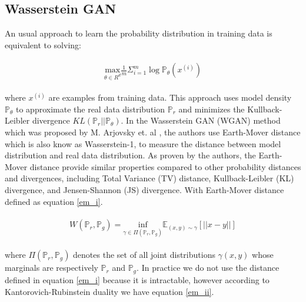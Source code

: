 \documentclass[10pt,twocolumn,letterpaper]{article}
\begin{document}
\subsection{Wasserstein GAN}
\label{wasserstein_gan}

An usual approach to learn the probability distribution in training data is equivalent to solving:

\begin{equation} 
\begin{split}
\begin{aligned}
\underset{\theta \in R^d}{\text{max}} \frac{1}{m} \Sigma_{i=1}^m \log \mathbb{P}_{\theta}(x^{(i)})
\end{aligned}
\end{split}
\label{loss_gan_ii}
\end{equation}

where $x^{(i)}$ are examples from training data. This approach uses model density $\mathbb{P}_\theta$ to approximate the real data distribution $\mathbb{P}_r$ and minimizes the Kullback-Leibler divergence $KL(\mathbb{P}_r||\mathbb{P}_\theta)$. In the Wasserstein GAN (WGAN) method which was proposed by M. Arjovsky et. al \cite{arjovsky2017wasserstein}, the authors use Earth-Mover distance which is also know as Wasserstein-1, to measure the distance between model distribution and real data distribution. As proven by the authors, the Earth-Mover distance provide similar properties compared to other probability distances and divergences, including Total Variance (TV) distance, Kullback-Leibler (KL) divergence, and Jensen-Shannon (JS) divergence. With Earth-Mover distance defined as equation \ref{em_i}.

\begin{equation} 
\begin{split}
\begin{aligned}
W(\mathbb{P}_r, \mathbb{P}_g) = \underset{\gamma \in \Pi(\mathbb{P}_r, \mathbb{P}_g)}{\text{inf}} \mathbb{E}_{(x, y) \sim\gamma}[||x - y||]
\end{aligned}
\end{split}
\label{em_i}
\end{equation}

where $\Pi(\mathbb{P}_r, \mathbb{P}_g)$ denotes the set of all joint distributions $\gamma(x, y)$ whose marginals are respectively $\mathbb{P}_r$ and $\mathbb{P}_g$. In practice we do not use the distance defined in equation \ref{em_i} because it is intractable, however according to Kantorovich-Rubinstein duality we have equation \ref{em_ii}.
\end{document}
